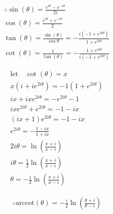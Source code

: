 \documentclass{../style}
\begin{document}
\euler

\begin{gather*}
	\therefore \sin(\theta) = \frac{e^{i\theta} - e^{-i\theta}}{2i} \\
	\cos(\theta) = \frac{e^{i\theta} + e^{-i\theta}}{2} \\
	\tan(\theta) = \frac{\sin(\theta)}{\cos{\theta}} = -\frac{i(-1 + e^{2i\theta})}{1 + e^{2i\theta}} \\
	\cot(\theta) = \frac{1}{\tan(\theta)} = -\frac{1 + e^{2i\theta}}{i(-1 + e^{2i\theta})}
\end{gather*}

\begin{gather*}
	\text{let} \quad \cot(\theta) = x \\
	x(i + ie^{2i\theta}) = -1(1 + e^{2i\theta}) \\
	ix + ixe^{2i\theta} = -e^{2i\theta} - 1 \\
	ixe^{2i\theta} + e^{2i\theta} = -1 - ix \\
	(ix + 1)e^{2i\theta} = -1 - ix \\
	e^{2i\theta} = -\frac{1 - ix}{1 + ix} \\
	2i\theta = \ln(\frac{x + i}{x - i}) \\
	i\theta = \frac{1}{2}\ln(\frac{x + i}{x - i}) \\
	\theta = -\frac{i}{2}\ln(\frac{x + i}{x - i})
\end{gather*}

\begin{gather*}
	\therefore \text{arccot}(\theta) = -\frac{i}{2}\ln(\frac{\theta + i}{\theta - i})
\end{gather*}
\end{document}
